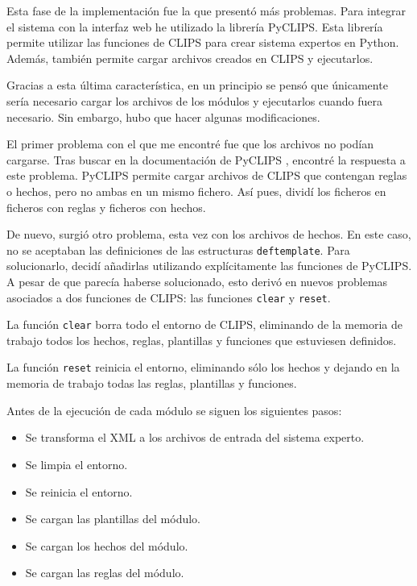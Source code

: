Esta fase de la implementación fue la que presentó más problemas. Para integrar el sistema con la interfaz web he utilizado la librería PyCLIPS. Esta librería permite utilizar las funciones de CLIPS para crear sistema expertos en Python. Además, también permite cargar archivos creados en CLIPS y ejecutarlos.

Gracias a esta última característica, en un principio se pensó que únicamente sería necesario cargar los archivos de los módulos y  ejecutarlos cuando fuera necesario. Sin embargo, hubo que hacer algunas modificaciones.

El primer problema con el que me encontré fue que los archivos no podían cargarse. Tras buscar en la documentación de PyCLIPS \cite{PYCLIPS}, encontré la respuesta a este problema. PyCLIPS permite cargar archivos de CLIPS que contengan reglas o hechos, pero no ambas en un mismo fichero. Así pues, dividí los ficheros en ficheros con reglas y ficheros con hechos. 

De nuevo, surgió otro problema, esta vez con los archivos de hechos. En este caso, no se aceptaban las definiciones de las estructuras \texttt{deftemplate}. Para solucionarlo, decidí añadirlas utilizando explícitamente las funciones de PyCLIPS. A pesar de que parecía haberse solucionado, esto derivó en nuevos problemas asociados a dos funciones de CLIPS: las funciones \texttt{clear} y \texttt{reset}.

\bigskip
La función \texttt{clear} borra todo el entorno de CLIPS, eliminando de la memoria de trabajo todos los hechos, reglas, plantillas y funciones que estuviesen definidos.

\bigskip
La función \texttt{reset} reinicia el entorno, eliminando sólo los hechos y dejando en la memoria de trabajo todas las reglas, plantillas y funciones.

\bigskip

Antes de la ejecución de cada módulo se siguen los siguientes pasos:

\begin{itemize}
	\item Se transforma el XML a los archivos de entrada del sistema experto.
	\item Se limpia el entorno.
	\item Se reinicia el entorno.
	\item Se cargan las plantillas del módulo.
	\item Se cargan los hechos del módulo.
	\item Se cargan las reglas del módulo.
\end{itemize}

